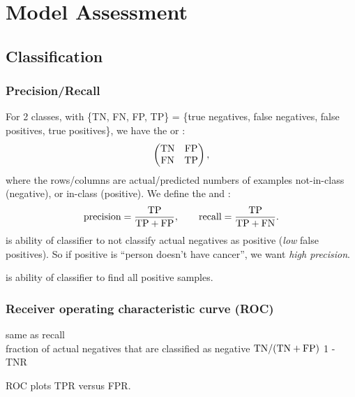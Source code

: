 \documentclass[11pt]{article}
\begin{document}
\section{Model Assessment}
\label{sec:model_ass}
\subsection{Classification}
\subsubsection{Precision/Recall}
For 2 classes, with \{TN, FN, FP, TP\} = \{true negatives, false negatives, false
positives, true positives\}, we have the  or :
\begin{equation}
  \left(
    \begin{matrix}
      \textrm{TN} & \textrm{FP}\\
      \textrm{FN} & \textrm{TP}
    \end{matrix}
  \right),
\end{equation}
where the rows/columns are actual/predicted numbers of examples not-in-class (negative),
or in-class (positive). We define the  and :
\begin{equation}
  \textrm{precision} = \frac{\textrm{TP}}{\textrm{TP} + \textrm{FP}}, \qquad
  \textrm{recall} = \frac{\textrm{TP}}{\textrm{TP} + \textrm{FN}}.
\end{equation}
 is ability of classifier to not classify actual negatives as positive
(\eie \emph{low} false positives). So \eeg if positive is ``person doesn't have
cancer'', we want \emph{high precision}.

 is ability of classifier to find all positive samples.

\subsubsection{Receiver operating characteristic curve (ROC)}
 same as recall \\
 fraction of actual negatives that are classified as
negative $\textrm{TN}/(\textrm{TN} + \textrm{FP})$
 1 - TNR

ROC plots TPR versus FPR.

\end{document}
